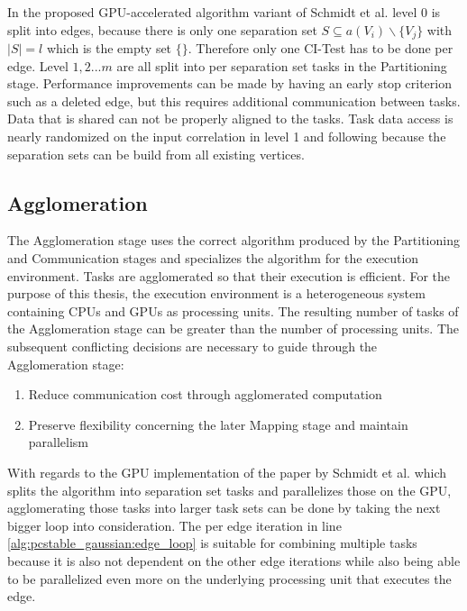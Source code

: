 In the proposed GPU-accelerated algorithm variant of Schmidt et al. \cite{schmidtOrderIndependentConstraintBasedCausal2018} level 0 is split into edges, because there is only one separation set $S \subseteq a(V_i ) \backslash \{V_j\}$ with $| S | = l$ which is the empty set $\{\}$. Therefore only one CI-Test has to be done per edge.
Level $1,2 ... m$ are all split into per separation set tasks in the Partitioning stage. Performance improvements can be made by having an early stop criterion such as a deleted edge, but this requires additional communication between tasks. Data that is shared can not be properly aligned to the tasks. Task data access is nearly randomized on the input correlation in level 1 and following because the separation sets can be build from all existing vertices. 

    
\subsection{Agglomeration}
\label{chap:agglo}
The Agglomeration stage uses the correct algorithm produced by the Partitioning and Communication stages and specializes the algorithm for the execution environment. Tasks are agglomerated so that their execution is efficient. For the purpose of this thesis, the execution environment is a heterogeneous system containing CPUs and GPUs as processing units. The resulting number of tasks of the Agglomeration stage can be greater than the number of processing units. The subsequent conflicting decisions are necessary to guide through the Agglomeration stage:

\begin{enumerate}
    \item Reduce communication cost through agglomerated computation
    \item Preserve flexibility concerning the later Mapping stage and maintain parallelism
\end{enumerate}

With regards to the GPU implementation of the paper by Schmidt et al. \cite{schmidtOrderIndependentConstraintBasedCausal2018} which splits the algorithm into separation set tasks and parallelizes those on the GPU, agglomerating those tasks into larger task sets can be done by taking the next bigger loop into consideration. The per edge iteration in line \ref{alg:pcstable_gaussian:edge_loop} is suitable for combining multiple tasks because it is also not dependent on the other edge iterations while also being able to be parallelized even more on the underlying processing unit that executes the edge.

